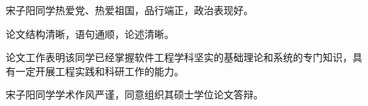 
\begin{comments}

宋子阳同学热爱党、热爱祖国，品行端正，政治表现好。

论文结构清晰，语句通顺，论述清晰。

论文工作表明该同学已经掌握软件工程学科坚实的基础理论和系统的专门知识，具有一定开展工程实践和科研工作的能力。

宋子阳同学学术作风严谨，同意组织其硕士学位论文答辩。
\end{comments}
